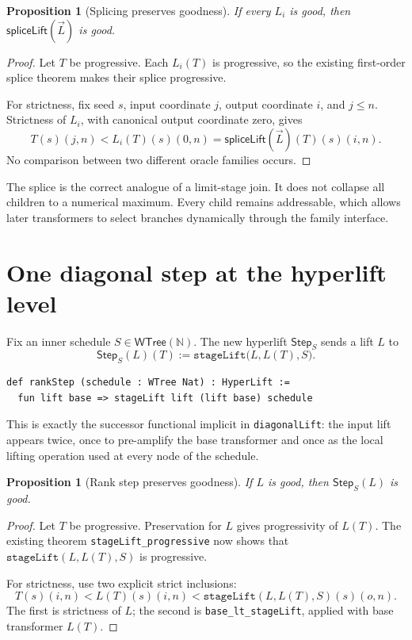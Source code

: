 \documentclass[11pt]{article}
\newtheorem{proposition}[theorem]{Proposition}
\theoremstyle{definition}
\theoremstyle{remark}
\newcommand{\N}{\mathbb{N}}
\newcommand{\code}[1]{\texttt{#1}}
\newcommand{\Step}{\mathsf{Step}}
\newcommand{\WTree}{\mathsf{WTree}}
\begin{document}
\begin{proposition}[Splicing preserves goodness]\label{prop:splice}
If every \(L_i\) is good, then \(\mathsf{spliceLift}(\vec L)\) is good.
\end{proposition}

\begin{proof}
Let \(T\) be progressive.  Each \(L_i(T)\) is progressive, so the existing
first-order splice theorem makes their splice progressive.

For strictness, fix seed \(s\), input coordinate \(j\), output coordinate
\(i\), and \(j\le n\).  Strictness of \(L_i\), with canonical output coordinate
zero, gives
\[
T(s)(j,n)<L_i(T)(s)(0,n)
=\mathsf{spliceLift}(\vec L)(T)(s)(i,n).
\]
No comparison between two different oracle families occurs.
\end{proof}

The splice is the correct analogue of a limit-stage join.  It does not collapse
all children to a numerical maximum.  Every child remains addressable, which
allows later transformers to select branches dynamically through the family
interface.

\section{One diagonal step at the hyperlift level}

Fix an inner schedule \(S\in\WTree(\N)\).  The new hyperlift
\(\Step_S\) sends a lift \(L\) to
\[
\Step_S(L)(T):=\code{stageLift}\bigl(L,L(T),S\bigr).
\]

\begin{lstlisting}
def rankStep (schedule : WTree Nat) : HyperLift :=
  fun lift base => stageLift lift (lift base) schedule
\end{lstlisting}

This is exactly the successor functional implicit in \code{diagonalLift}: the
input lift appears twice, once to pre-amplify the base transformer and once as
the local lifting operation used at every node of the schedule.

\begin{proposition}[Rank step preserves goodness]\label{prop:rankgood}
If \(L\) is good, then \(\Step_S(L)\) is good.
\end{proposition}

\begin{proof}
Let \(T\) be progressive.  Preservation for \(L\) gives progressivity of
\(L(T)\).  The existing theorem \code{stageLift\_progressive} now shows that
\(\code{stageLift}(L,L(T),S)\) is progressive.

For strictness, use two explicit strict inclusions:
\[
T(s)(i,n)<L(T)(s)(i,n)
<\code{stageLift}(L,L(T),S)(s)(o,n).
\]
The first is strictness of \(L\); the second is
\code{base\_lt\_stageLift}, applied with base transformer \(L(T)\).
\end{proof}
\end{document}
